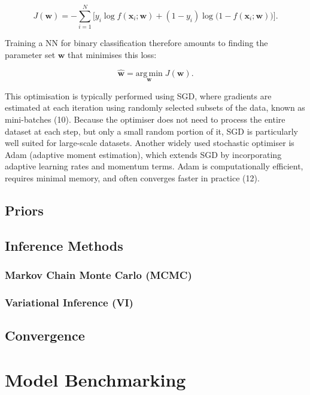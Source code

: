 \documentclass[
  a4paper,
]{scrreprt}
\begin{document}
\[
J(\mathbf{w}) = -\sum_{i=1}^N \big[ y_i \log f(\mathbf{x}_i; \mathbf{w}) + (1-y_i) \log \big( 1 - f(\mathbf{x}_i; \mathbf{w}) \big) \big].
\]

Training a NN for binary classification therefore amounts to finding the
parameter set \(\mathbf{w}\) that minimises this loss:

\[
\hat{\mathbf{w}} = \underset{\mathbf{w}}{\mathrm{arg\,min}} \; J(\mathbf{w}).
\]

This optimisation is typically performed using SGD, where gradients are
estimated at each iteration using randomly selected subsets of the data,
known as mini-batches (10). Because the optimiser does not need to
process the entire dataset at each step, but only a small random portion
of it, SGD is particularly well suited for large-scale datasets. Another
widely used stochastic optimiser is Adam (adaptive moment estimation),
which extends SGD by incorporating adaptive learning rates and momentum
terms. Adam is computationally efficient, requires minimal memory, and
often converges faster in practice (12).

\subsection{Priors}\label{priors}

\subsection{Inference Methods}\label{inference-methods}

\subsubsection{Markov Chain Monte Carlo
(MCMC)}\label{markov-chain-monte-carlo-mcmc}

\subsubsection{Variational Inference
(VI)}\label{variational-inference-vi}

\subsection{Convergence}\label{convergence}

\section{Model Benchmarking}\label{model-benchmarking}
\end{document}
